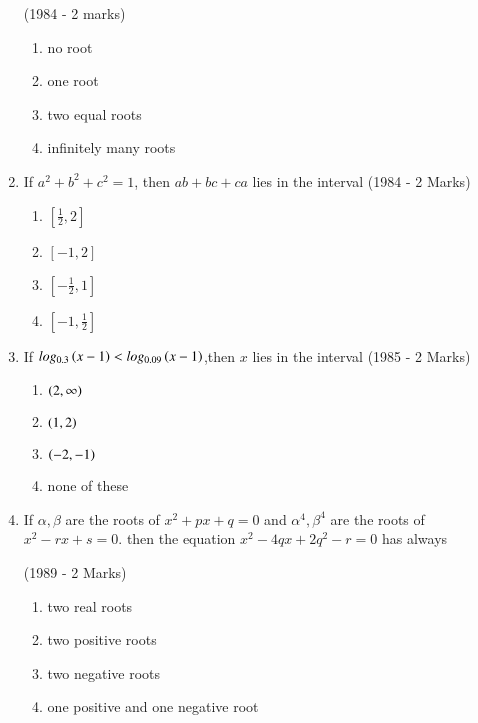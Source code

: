 \documentclass[journal,12pt,twocolumn]{IEEEtran}
\theoremstyle{remark}
\begin{document}
\begin{enumerate}
\hfill (1984 - 2 marks)
\begin{enumerate}
\item no root
\item one root
\item two equal roots
\item infinitely many roots 
\end{enumerate}
\item If $a^2+b^2+c^2=1$, then $ab+bc+ca$ lies in the interval \hfill (1984 - 2 Marks)
\begin{enumerate}
\item $[\frac{1}{2},2]$
\item $[-1,2]$
\item $[-\frac{1}{2},1]$
\item $[-1,\frac{1}{2}]$
\end{enumerate}
\item If $log_{0.3}\left(x-1\right)<log_{0.09}\left(x-1\right)$,then $x$ lies in the interval 
\hfill (1985 - 2 Marks)
\begin{enumerate}
\item $\left(2,\infty\right)$
\item $\left(1,2\right)$
\item $\left(-2,-1\right)$
\item none of these
\end{enumerate}
\item If $\alpha,\beta$ are the roots of $x^2+px+q=0$ and $\alpha^4,\beta^4$ are the roots of $x^2-rx+s=0$. then the equation $x^2-4qx+2q^2-r=0$ has always
 
\hfill(1989 - 2 Marks)
\begin{enumerate}
\item two real roots
\item two positive roots
\item two negative roots
\item one positive and one negative root

\end{enumerate}
\end{enumerate}
\end{document}
